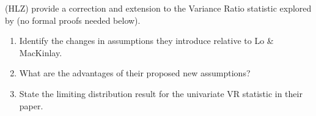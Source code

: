 \citet{hong2017investigation} (HLZ) provide a correction and extension to the
Variance Ratio statistic explored by \citet{lo1988stock} (no formal proofs needed below).
\begin{enumerate}[label = \alph*)]
    \item Identify the changes in assumptions they introduce relative to Lo \& MacKinlay.
    \item What are the advantages of their proposed new assumptions?
    \item State the limiting distribution result for the univariate VR statistic in their paper.
\end{enumerate}
